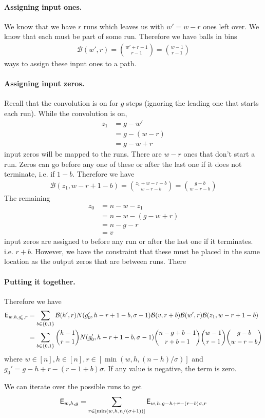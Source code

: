 \paragraph{Assigning input ones.} We know that we have $r$ runs which leaves us with $w'=w-r$ ones left over. We know that each must be part of some run. Therefore we have balls in bins
\begin{align}
\mathcal{B}(w',r)={w'+r-1\choose r-1}={w-1\choose r-1}
\end{align}
ways to assign these input ones to a path.

\paragraph{Assigning input zeros. } Recall that the convolution is on for $g$ steps (ignoring the leading one that starts each run). While the convolution is on, 
\begin{align*}    
z_1 &= g-w'\\
&=g-(w-r)\\
&=g-w+r
\end{align*}
input zeros will be mapped to the runs. There are $w-r$ ones that don't start a run. Zeros can go before any one of these or after the last one if it does not terminate, i.e. if $1-b$. Therefore we have 
\begin{align}
    \mathcal{B}(z_1, w-r+1-b)={z_1+w-r-b\choose w-r-b}={g-b\choose w-r-b}
\end{align}
The remaining 
\begin{align*}
z_0&=n-w-z_1\\
&=n-w-(g-w+r)\\
&=n-g-r\\
&=v
\end{align*}
input zeros are assigned to before any run or after the last one if it terminates. i.e. $r+b$. However, we have the constraint that these must be placed in the same location as the output zeros that are between runs. There







\paragraph{Putting it together.} Therefore we have
\begin{align*}
\mathsf{E}_{w,h,g_0',r}&=\sum_{b\in\{0,1\}}
\mathcal{B}(h',r)
N(g_0', h-r+1-b, \sigma-1)
\mathcal{B}(v,r+b)
\mathcal{B}(w',r)
\mathcal{B}(z_1,w-r+1-b)\\
&=\sum_{b\in\{0,1\}}
{h-1\choose r-1}
N(g_0', h-r+1-b, \sigma-1)
{n-g+b-1\choose r+b-1}
{w-1\choose r-1}
{g-b\choose w-r-b}
\end{align*}
where $w\in[n],h\in[n],r\in [\min(w,h,(n-h)/\sigma)]$ and $g_0'=g-h+r-(r-1+b)\sigma$. If any value is negative, the term is zero.

We can iterate over the possible runs to get
$$
\mathsf{E}_{w,h,g}=\sum_{r\in[\min(w,h,n/(\sigma+1))]} \mathsf{E}_{w,h,g-h+r-(r-b)\sigma, r}
$$



\fi